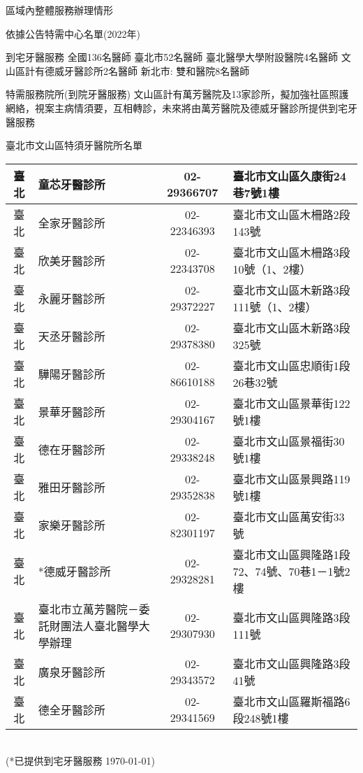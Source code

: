 \clearpage
區域內整體服務辦理情形

依據公告特需中心名單(2022年)
\begin{outline}

\1 到宅牙醫服務
\2 全國136名醫師
\2 臺北市52名醫師
    \3 臺北醫學大學附設醫院4名醫師
    \3 文山區計有德威牙醫診所2名醫師
\2 新北市: 雙和醫院8名醫師

\1 特需服務院所(到院牙醫服務)
\2 文山區計有萬芳醫院及13家診所，擬加強社區照護網絡，視案主病情須要，互相轉診，未來將由萬芳醫院及德威牙醫診所提供到宅牙醫服務
\end{outline}

臺北市文山區特須牙醫院所名單\\
\begin{tabularx}{1.0625\textwidth}{|c|p{3.2cm}|c|l|}
\hline
臺北&	童芯牙醫診所&	02-29366707 &	臺北市文山區久康街24巷7號1樓\\
\hline
臺北&	全家牙醫診所&	02-22346393 &	臺北市文山區木柵路2段143號\\
\hline
臺北 &	欣美牙醫診所 &	02-22343708 &	臺北市文山區木柵路3段10號（1、2樓）\\
\hline
臺北 &	永麗牙醫診所 &	02-29372227 &	臺北市文山區木新路3段111號（1、2樓）\\
\hline
臺北 &	天丞牙醫診所 &	02-29378380 &	臺北市文山區木新路3段325號\\
\hline
臺北 &	驊陽牙醫診所 &	02-86610188 &	臺北市文山區忠順街1段26巷32號\\
\hline
臺北 &	景華牙醫診所 &	02-29304167 &	臺北市文山區景華街122號1樓\\
\hline
臺北 &	德在牙醫診所 &	02-29338248 &	臺北市文山區景福街30號1樓\\
\hline
臺北 &	雅田牙醫診所 &	02-29352838 &	臺北市文山區景興路119號1樓\\
\hline
臺北 &	家樂牙醫診所 &	02-82301197 &	臺北市文山區萬安街33號\\
\hline
臺北 &	*德威牙醫診所 &	02-29328281 &	臺北市文山區興隆路1段72、74號、70巷1－1號2樓\\
\hline
臺北 &	臺北市立萬芳醫院－委託財團法人臺北醫學大學辦理
&	02-29307930 &	臺北市文山區興隆路3段111號\\
\hline
臺北 &	廣泉牙醫診所 &	02-29343572 &	臺北市文山區興隆路3段41號\\
\hline
臺北 &	德全牙醫診所 &	02-29341569 &	臺北市文山區羅斯福路6段248號1樓\\
\hline
\end{tabularx}\\
(*已提供到宅牙醫服務 \today)

